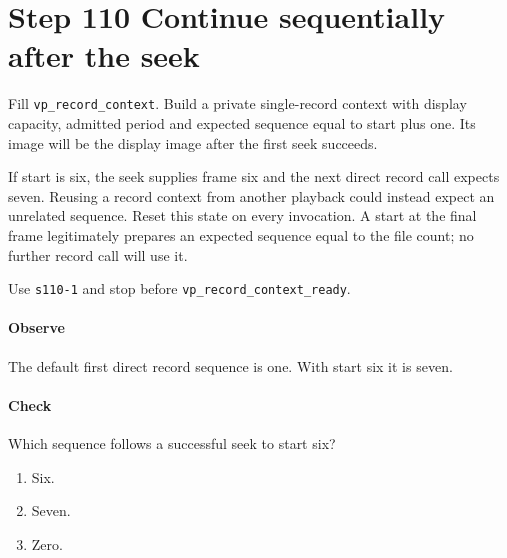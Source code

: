 \section{Step 110 Continue sequentially after the seek}
Fill \texttt{vp\_record\_context}. Build a private single-record context with display capacity, admitted period and expected sequence equal to start plus one. Its image will be the display image after the first seek succeeds.

If start is six, the seek supplies frame six and the next direct record call expects seven. Reusing a record context from another playback could instead expect an unrelated sequence. Reset this state on every invocation. A start at the final frame legitimately prepares an expected sequence equal to the file count; no further record call will use it.

Use \texttt{s110-1} and stop before \texttt{vp\_record\_context\_ready}.

\paragraph{Observe} The default first direct record sequence is one. With start six it is seven.

\paragraph{Check} Which sequence follows a successful seek to start six?
\begin{enumerate}[label=\Alph*.]
  \item Six.
  \item Seven.
  \item Zero.
\end{enumerate}
